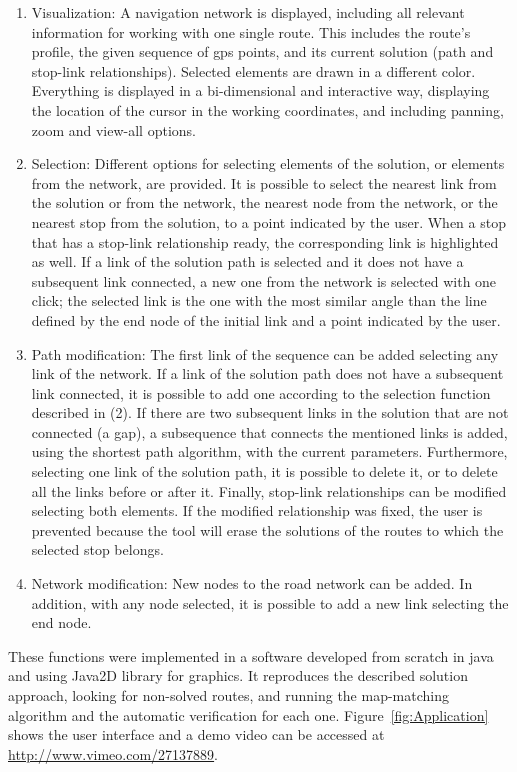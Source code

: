 \begin{enumerate}\styleEnumerate
\item Visualization: A navigation network is displayed, including all relevant information for working with one single route. This includes the route's profile, the given sequence of \gls{gps} points, and its current solution (path and stop-link relationships). Selected elements are drawn in a different color. Everything is displayed in a bi-dimensional and interactive way, displaying the location of the cursor in the working coordinates, and including panning, zoom and view-all options.
%
\item Selection: Different options for selecting elements of the solution, or elements from the network, are provided. It is possible to select the nearest link from the solution or from the network, the nearest node from the network, or the nearest stop from the solution, to a point indicated by the user. When a stop that has a stop-link relationship ready, the corresponding link is highlighted as well. If a link of the solution path is selected and it does not have a subsequent link connected, a new one from the network is selected with one click; the selected link is the one with the most similar angle than the line defined by the end node of the initial link and a point indicated by the user.
%
\item Path modification: The first link of the sequence can be added selecting any link of the network. If a link of the solution path does not have a subsequent link connected, it is possible to add one according to the selection function described in (2). If there are two subsequent links in the solution that are not connected (a gap), a subsequence that connects the mentioned links is added, using the shortest path algorithm, with the current parameters. Furthermore, selecting one link of the solution path, it is possible to delete it, or to delete all the links before or after it. Finally, stop-link relationships can be modified selecting both elements. If the modified relationship was fixed, the user  is prevented because the tool will erase the solutions of the routes to which the selected stop belongs.
%
\item Network modification: New nodes to the road network can be added. In addition, with any node selected, it is possible to add a new link selecting the end node.
\end{enumerate}

These functions were implemented in a software developed from scratch in \gls{java} and using Java2D library for graphics. It reproduces the described solution approach, looking for non-solved routes, and running the map-matching algorithm and the automatic verification for each one. Figure~\ref{fig:Application} shows the user interface and a demo video can be accessed at \url{http://www.vimeo.com/27137889}.

